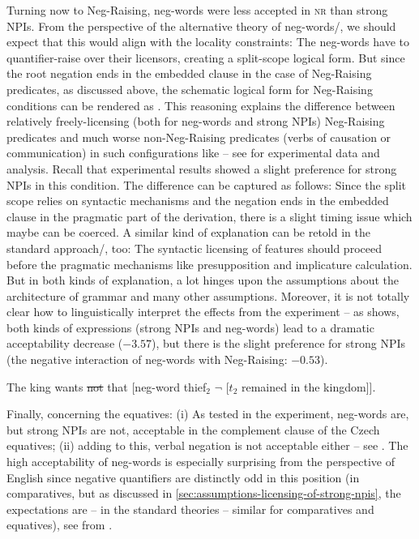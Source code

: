 \documentclass[output=paper,colorlinks,citecolor=brown]{langscibook}
\begin{document}
\noindent Turning now to Neg-Raising, neg-words were less accepted in \textsc{nr} than strong NPIs. From the perspective of the alternative theory of neg-words/\citet{ovalle2004double}, we should expect that this would align with the locality constraints: The neg-words have to quantifier-raise over their licensors, creating a split-scope logical form. But since the root negation ends in the embedded clause in the case of Neg-Raising predicates, as discussed above, the schematic logical form for Neg-Raising conditions can be rendered as . This reasoning explains the difference between relatively freely-licensing (both for neg-words and strong NPIs) Neg-Raising predicates and much worse non-Neg-Raising predicates (verbs of causation or communication) in such configurations like  -- see \citet{dovcekal2016experimentala} for experimental data and analysis. Recall that experimental results showed a slight preference for strong NPIs in this condition. The difference can be captured as follows: Since the split scope relies on syntactic mechanisms and the negation ends in the embedded clause in the pragmatic part of the derivation, there is a slight timing issue which maybe can be coerced. A similar kind of explanation can be retold in the standard approach/\citet{zeijlstra2004sentential}, too: The syntactic licensing of features should proceed before the pragmatic mechanisms like presupposition and implicature calculation. But in both kinds of explanation, a lot hinges upon the assumptions about the architecture of grammar and many other assumptions. Moreover, it is not totally clear how to linguistically interpret the effects from the experiment -- as  shows, both kinds of expressions (strong NPIs and neg-words) lead to a dramatic acceptability decrease ($-3.57$), but there is the slight preference for strong NPIs (the negative interaction of neg-words with Neg-Raising: $-0.53$).

\ea\label{ex-16} The king wants \sout{not} that  [neg-word thief$_2$ $\neg$ [$t_2$ remained in the kingdom]].
\z

\noindent Finally, concerning the equatives: (i) As tested in the experiment, neg-words are, but strong NPIs are not, acceptable in the complement clause of the Czech equatives; (ii) adding to this, verbal negation is not acceptable either -- see . The high acceptability of neg-words is especially surprising from the perspective of English since negative quantifiers are distinctly odd in this position (in comparatives, but as discussed in \ref{sec:assumptions-licensing-of-strong-npis}, the expectations are -- in the standard theories -- similar for comparatives and equatives), see  from \citet{gajewski2008more}.
\end{document}

